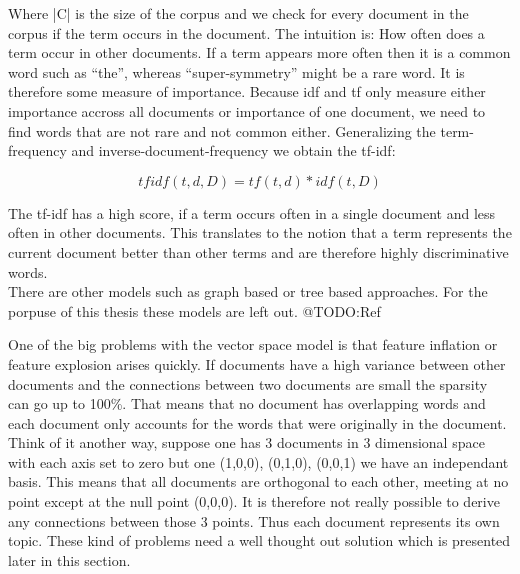     Where |C| is the size of the corpus and we check for every document in the corpus if the term occurs in the document. The intuition is: How often does a term occur in other documents. If a term appears more often then it is a common word such as ``the'', whereas ``super-symmetry'' might be a rare word. It is therefore some measure of importance. Because idf and tf only measure either importance accross all documents or importance of one document, we need to find words that are not rare and not common either. Generalizing the term-frequency and inverse-document-frequency we obtain the tf-idf:

    \begin{equation}
      tfidf(t, d, D) = tf(t, d) * idf(t, D)
    \end{equation}

    The tf-idf has a high score, if a term occurs often in a single document and less often in other documents. This translates to the notion that a term represents the current document better than other terms and are therefore highly discriminative words.\\

    There are other models such as graph based or tree based approaches. For the porpuse of this thesis these models are left out. @TODO:Ref

    One of the big problems with the vector space model is that feature inflation or feature explosion arises quickly. If documents have a high variance between other documents and the connections between two documents are small the sparsity can go up to 100\%. That means that no document has overlapping words and each document only accounts for the words that were originally in the document. Think of it another way, suppose one has 3 documents in 3 dimensional space with each axis set to zero but one (1,0,0), (0,1,0), (0,0,1) we have an independant basis. This means that all documents are orthogonal to each other, meeting at no point except at the null point (0,0,0). It is therefore not really possible to derive any connections between those 3 points. Thus each document represents its own topic.
    These kind of problems need a well thought out solution which is presented later in this section.


